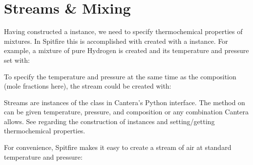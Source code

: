 \documentclass[letterpaper,10pt,english]{sphinxmanual}
\begin{document}
\section{Streams \& Mixing}
\label{\detokenize{combustion:streams-mixing}}
Having constructed a  instance, we need to specify thermochemical properties of mixtures.
In Spitfire this is accomplished with  created with a  instance.
For example, a mixture of pure Hydrogen is created and its temperature and pressure set with:

\begin{sphinxVerbatim}[commandchars=\\\{\}]
   
   
\end{sphinxVerbatim}

To specify the temperature and pressure at the same time as the composition (mole fractions here), the stream could be created with:

\begin{sphinxVerbatim}[commandchars=\\\{\}]
     
\end{sphinxVerbatim}

Streams are instances of the  class in Cantera’s Python interface.
The  method on  can be given temperature, pressure, and composition or any combination Cantera allows.
See  regarding the construction of  instances and setting/getting thermochemical properties.

For convenience, Spitfire makes it easy to create a stream of air at standard temperature and pressure:
\end{document}
